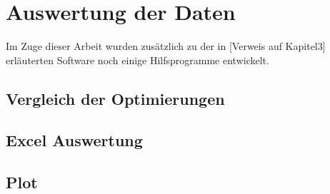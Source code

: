 
\chapter{Auswertung der Daten}{\label{Kap4}}

Im Zuge dieser Arbeit wurden zusätzlich zu der in [Verweis auf Kapitel3] erläuterten Software noch einige Hilfsprogramme entwickelt. 

\section{Vergleich der Optimierungen}


\section{Excel Auswertung}


\section{Plot}




